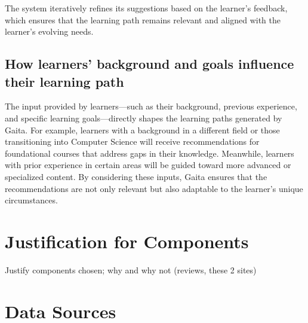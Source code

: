 The system iteratively refines its suggestions based on the learner's feedback, which ensures that the learning path remains relevant and aligned with the learner's evolving needs.

\subsection{How learners' background and goals influence their learning path}

The input provided by learners—such as their background, previous experience, and specific learning goals—directly shapes the learning paths generated by Gaita. For example, learners with a background in a different field or those transitioning into Computer Science will receive recommendations for foundational courses that address gaps in their knowledge. Meanwhile, learners with prior experience in certain areas will be guided toward more advanced or specialized content. By considering these inputs, Gaita ensures that the recommendations are not only relevant but also adaptable to the learner's unique circumstances.

\section{Justification for Components} 
Justify components chosen; why and why not (reviews, these 2 sites) 


\section{Data Sources}